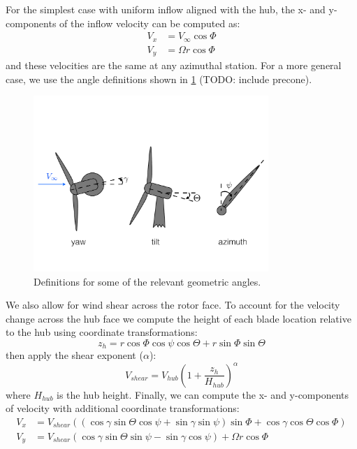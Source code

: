 \documentclass{article}
\begin{document}
For the simplest case with uniform inflow aligned with the hub, the x- and y-components of the inflow velocity can be computed as:
\begin{equation}
\begin{aligned}
    V_x &= V_\infty \cos\Phi\\
    V_y &= \Omega r \cos\Phi
\end{aligned}
\end{equation}
and these velocities are the same at any azimuthal station.  For a more general case, we use the angle definitions shown in \cref{fig:angles} (TODO: include precone).
\begin{figure}[htbp]
\centering
\includegraphics[width=3.5in]{figures/angles}
\caption{Definitions for some of the relevant geometric angles.}
\label{fig:angles}
\end{figure}
We also allow for wind shear across the rotor face.  To account for the velocity change across the hub face we compute the height of each blade location relative to the hub using coordinate transformations:
\begin{equation}
    z_h = r \cos\Phi \cos\psi \cos\Theta + r \sin\Phi\sin\Theta
\end{equation}
then apply the shear exponent ($\alpha$):
\begin{equation}
    V_{shear} = V_{hub} \left(1 + \frac{z_h}{H_{hub}} \right)^\alpha
\end{equation}
where $H_{hub}$ is the hub height.  Finally, we can compute the x- and y-components of velocity with additional coordinate transformations:
\begin{equation}
\begin{aligned}
V_x &= V_{shear} ((\cos \gamma \sin \Theta \cos \psi + \sin \gamma \sin \psi)\sin \Phi + \cos \gamma \cos \Theta \cos \Phi)\\
V_y &= V_{shear} (\cos \gamma \sin \Theta\sin \psi - \sin \gamma \cos \psi) + \Omega r \cos\Phi
\end{aligned}
\end{equation}
\end{document}
